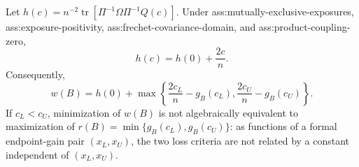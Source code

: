 Let \(h(c)=n^{-2}\operatorname{tr}[\Pi^{-1}\Omega\Pi^{-1}Q(c)]\).  Under ass:mutually-exclusive-exposures, ass:exposure-positivity, ass:frechet-covariance-domain, and ass:product-coupling-zero,
\[
h(c)=h(0)+\frac{2c}{n}.
\]
Consequently,
\[
w(B)=h(0)+\max\left\{\frac{2c_L}{n}-g_B(c_L),\frac{2c_U}{n}-g_B(c_U)\right\}.
\]
If \(c_L<c_U\), minimization of \(w(B)\) is not algebraically equivalent to maximization of \(r(B)=\min\{g_B(c_L),g_B(c_U)\}\): as functions of a formal endpoint-gain pair \((x_L,x_U)\), the two loss criteria are not related by a constant independent of \((x_L,x_U)\).